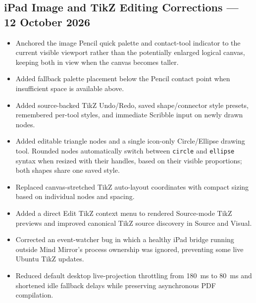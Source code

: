 \documentclass[a4paper]{article}
\begin{document}
\begin{preview}
\section{iPad Image and TikZ Editing Corrections --- 12 October 2026}
\begin{itemize}
\item Anchored the image Pencil quick palette and contact-tool indicator to the current visible viewport rather than the potentially enlarged logical canvas, keeping both in view when the canvas becomes taller.
\item Added fallback palette placement below the Pencil contact point when insufficient space is available above.
\item Added source-backed TikZ Undo/Redo, saved shape/connector style presets, remembered per-tool styles, and immediate Scribble input on newly drawn nodes.
\item Added editable triangle nodes and a single icon-only Circle/Ellipse drawing tool. Rounded nodes automatically switch between \texttt{circle} and \texttt{ellipse} syntax when resized with their handles, based on their visible proportions; both shapes share one saved style.
\item Replaced canvas-stretched TikZ auto-layout coordinates with compact sizing based on individual nodes and spacing.
\item Added a direct Edit TikZ context menu to rendered Source-mode TikZ previews and improved canonical TikZ source discovery in Source and Visual.
\item Corrected an event-watcher bug in which a healthy iPad bridge running outside Mind Mirror's process ownership was ignored, preventing some live Ubuntu TikZ updates.
\item Reduced default desktop live-projection throttling from 180~ms to 80~ms and shortened idle fallback delays while preserving asynchronous PDF compilation.
\end{itemize}
\end{preview}
\end{document}
